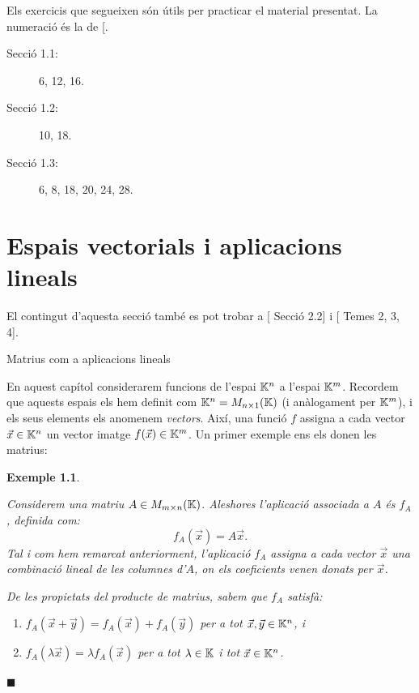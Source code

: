 \documentclass[
  11pt,
]{book}
\makeatletter
\numberwithin{dummy}{section}
\theoremstyle{maincolornumbox}
\theoremstyle{blacknumex}
\newtheorem{exampleT}{Exemple}[chapter]
\theoremstyle{blacknumbox}
\theoremstyle{maincolornum}
\newenvironment{example}{\begin{exampleT}}{\hfill{\tiny\ensuremath{\blacksquare}}\end{exampleT}}
\renewcommand{\section}{\@startsection{section}{1}{\z@}
{-4ex \@plus -1ex \@minus -.4ex}
{1ex \@plus.2ex }
{\normalfont\large\sffamily\bfseries}}
\newlength\esp
\makeatother
\begin{document}
Els exercicis que segueixen són útils per practicar el material
presentat. La numeració és la de {[}\citeproc{ref-Bret}{1}{]}.

\begin{description}
\item[Secció 1.1:]
6, 12, 16.
\item[Secció 1.2:]
10, 18.
\item[Secció 1.3:]
6, 8, 18, 20, 24, 28.
\end{description}

\chapter{Espais vectorials i aplicacions lineals}\label{espais-vectorials-i-aplicacions-lineals}

El contingut d'aquesta secció també es pot trobar a {[} Secció 2.2{]} i
{[} Temes 2, 3, 4{]}.

\section{Matrius com a aplicacions lineals}\label{subsec:matriusapl}

En aquest capítol considerarem funcions de l'espai \(\mathbb{K}^n\) a l'espai
\(\mathbb{K}^m\). Recordem que aquests espais els hem definit com
\(\mathbb{K}^n=M_{n\times 1}(\mathbb{K})\) (i anàlogament per \(\mathbb{K}^m\)), i els seus elements
els anomenem \emph{vectors}. Així, una funció \(f\) assigna a cada vector
\(\vec x\in \mathbb{K}^n\) un vector imatge \(f(\vec x)\in \mathbb{K}^m\). Un primer exemple
ens els donen les matrius:

\begin{example}
\protect\hypertarget{exm:Alineal}{}\label{exm:Alineal}

Considerem una matriu
\(A\in M_{m\times n}(\mathbb{K})\). Aleshores l'aplicació associada a \(A\) és
\(f_A\), definida com: \[f_A(\vec x) = A\vec x.\] Tal i com hem remarcat
anteriorment, l'aplicació \(f_A\) assigna a cada vector \(\vec x\) una
combinació lineal de les columnes d'\(A\), on els coeficients venen donats
per \(\vec x\).

De les propietats del producte de matrius, sabem que \(f_A\) satisfà:

\begin{enumerate}
\def\labelenumi{\arabic{enumi}.}
\item
  \(f_A(\vec x+\vec y) = f_A(\vec x) + f_A(\vec y)\) per a tot
  \(\vec x, \vec y \in \mathbb{K}^n\), i
\item
  \(f_A(\lambda \vec x) = \lambda f_A(\vec x)\) per a tot \(\lambda\in\mathbb{K}\)
  i tot \(\vec x\in \mathbb{K}^n\).
\end{enumerate}

\end{example}
\end{document}
